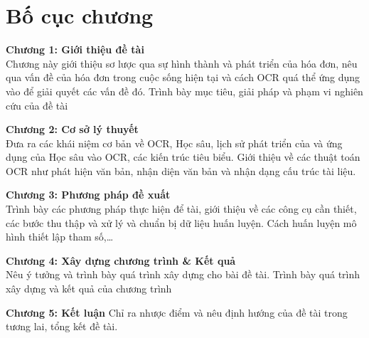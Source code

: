 \section{Bố cục chương}
\textbf{Chương 1: Giới thiệu đề tài} \\Chương này giới thiệu sơ lược qua sự hình thành và phát triển của hóa đơn, nêu qua vấn đề của hóa đơn trong cuộc sống hiện tại và cách OCR quá thể ứng dụng vào để giải quyết các vấn đề đó. Trình bày mục tiêu, giải pháp và phạm vi nghiên cứu của đề tài 

\textbf{Chương 2: Cơ sở lý thuyết} \\Đưa ra các khái niệm cơ bản về OCR, Học sâu, lịch sử phát triển của và ứng dụng của Học sâu vào OCR, các kiến trúc tiêu biểu. Giới thiệu về các thuật toán OCR như phát hiện văn bản, nhận diện văn bản và nhận dạng cấu trúc tài liệu.

\textbf{Chương 3: Phương pháp đề xuất} \\Trình bày các phương pháp thực hiện để tài, giới thiệu về các công cụ cần thiết, các bước thu thập và xử lý và chuẩn bị dữ liệu huấn luyện. Cách huấn luyện mô hình thiết lập tham số,\dots

\textbf{Chương 4: Xây dựng chương trình \& Kết quả} \\Nêu ý tưởng và trình bày quá trình xây dựng cho bài đề tài. Trình bày quá trình xây dựng và kết quả của chương trình

\textbf{Chương 5: Kết luận} Chỉ ra nhược điểm và nêu định hướng của đề tài trong tương lai, tổng kết đề tài.
